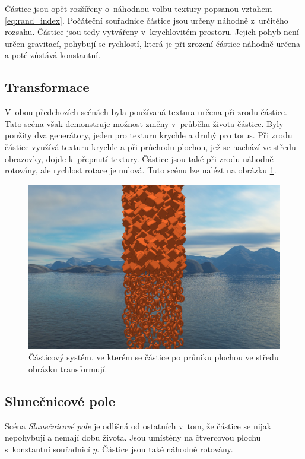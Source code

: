 Částice jsou opět rozšířeny o~náhodnou volbu textury popsanou vztahem \ref{eq:rand_index}. Počáteční souřadnice částice jsou určeny náhodně z~určitého rozsahu. Částice jsou tedy vytvářeny v~krychlovitém prostoru. Jejich pohyb není určen gravitací, pohybují se rychlostí, která je při zrození částice náhodně určena a poté zůstává konstantní.




\subsection*{Transformace}
V~obou předchozích scénách byla používaná textura určena při zrodu částice. Tato scéna však demonstruje možnost změny v~průběhu života částice. Byly použity dva generátory, jeden pro texturu krychle a druhý pro torus. Při zrodu částice využívá texturu krychle a při průchodu plochou, jež se nachází ve středu obrazovky, dojde k~přepnutí textury. Částice jsou také při zrodu náhodně rotovány, ale rychlost rotace je nulová. Tuto scénu lze nalézt na obrázku \ref{fig:ps_transformation}.

\begin{figure}[H]
	\centering
	\includegraphics[width=1.0\textwidth]{obrazky-figures/transformace.png}
	\caption{Částicový systém, ve kterém se částice po průniku plochou ve středu obrázku transformují. }
	\label{fig:ps_transformation}
\end{figure}
\subsection*{Slunečnicové pole}
Scéna \emph{Slunečnicové pole} je odlišná od ostatních v~tom, že částice se nijak nepohybují a nemají dobu života. Jsou umístěny na čtvercovou plochu s~konstantní  souřadnicí $y$. Částice jsou také náhodně rotovány. 

